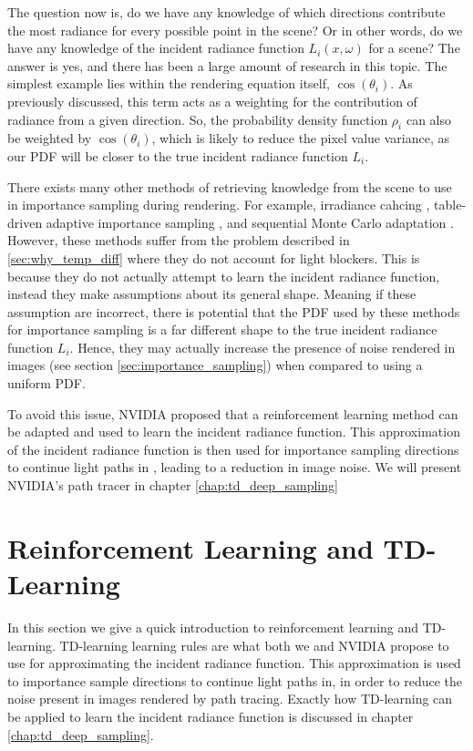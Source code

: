 \documentclass[../dissertation.tex]{subfiles}
\begin{document}
The question now is, do we have any knowledge of which directions contribute the most radiance for every possible point in the scene? Or in other words, do we have any knowledge of the incident radiance function $L_i(x, \omega)$ for a scene? The answer is yes, and there has been a large amount of research in this topic. The simplest example lies within the rendering equation itself, $\cos(\theta_i)$. As previously discussed, this term acts as a weighting for the contribution of radiance from a given direction. So, the probability density function $\rho_i$ can also be weighted by $\cos(\theta_i)$, which is likely to reduce the pixel value variance, as our PDF will be closer to the true incident radiance function $L_i$. 

There exists many other methods of retrieving knowledge from the scene to use in importance sampling during rendering. For example, irradiance cahcing \cite{bashford2012significance}, table-driven adaptive importance sampling \cite{cline2008table}, and sequential Monte Carlo adaptation \cite{pegoraro2008towards}. However, these methods suffer from the problem described in \ref{sec:why_temp_diff} where they do not account for light blockers. This is because they do not actually attempt to learn the incident radiance function, instead they make assumptions about its general shape. Meaning if these assumption are incorrect, there is potential that the PDF used by these methods for importance sampling is a far different shape to the true incident radiance function $L_i$. Hence, they may actually increase the presence of noise rendered in images (see section \ref{sec:importance_sampling}) when compared to using a uniform PDF. 

To avoid this issue, NVIDIA proposed that a reinforcement learning method can be adapted and used to learn the incident radiance function. This approximation of the incident radiance function is then used for importance sampling directions to continue light paths in \cite{dahm2017learning}, leading to a reduction in image noise. We will present NVIDIA's path tracer in chapter \ref{chap:td_deep_sampling}


\section{Reinforcement Learning and TD-Learning}

In this section we give a quick introduction to reinforcement learning and TD-learning. TD-learning learning rules are what both we and NVIDIA propose to use for approximating the incident radiance function. This approximation is used to importance sample directions to continue light paths in, in order to reduce the noise present in images rendered by path tracing. Exactly how TD-learning can be applied to learn the incident radiance function is discussed in chapter \ref{chap:td_deep_sampling}.
\end{document}
